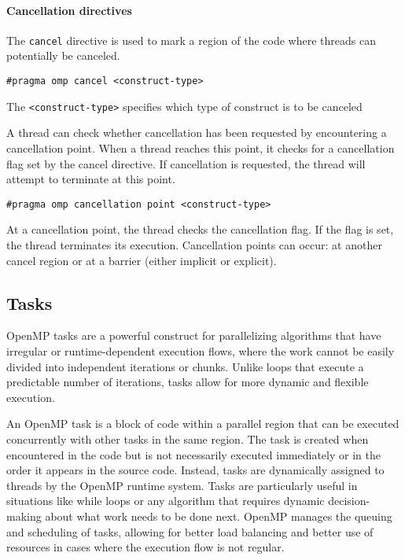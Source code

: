 \paragraph*{Cancellation directives}
The \texttt{cancel} directive is used to mark a region of the code where threads can potentially be canceled.
\begin{lstlisting}[style=C]
#pragma omp cancel <construct-type>
\end{lstlisting}
The \texttt{<construct-type>} specifies which type of construct is to be canceled

A thread can check whether cancellation has been requested by encountering a cancellation point.
When a thread reaches this point, it checks for a cancellation flag set by the cancel directive. 
If cancellation is requested, the thread will attempt to terminate at this point.
\begin{lstlisting}[style=C]
#pragma omp cancellation point <construct-type>
\end{lstlisting}
At a cancellation point, the thread checks the cancellation flag. 
If the flag is set, the thread terminates its execution. 
Cancellation points can occur: at another cancel region or at a barrier (either implicit or explicit).

\subsection{Tasks}
OpenMP tasks are a powerful construct for parallelizing algorithms that have irregular or runtime-dependent execution flows, where the work cannot be easily divided into independent iterations or chunks. 
Unlike loops that execute a predictable number of iterations, tasks allow for more dynamic and flexible execution.

An OpenMP task is a block of code within a parallel region that can be executed concurrently with other tasks in the same region. 
The task is created when encountered in the code but is not necessarily executed immediately or in the order it appears in the source code. 
Instead, tasks are dynamically assigned to threads by the OpenMP runtime system.
Tasks are particularly useful in situations like while loops or any algorithm that requires dynamic decision-making about what work needs to be done next. 
OpenMP manages the queuing and scheduling of tasks, allowing for better load balancing and better use of resources in cases where the execution flow is not regular.

